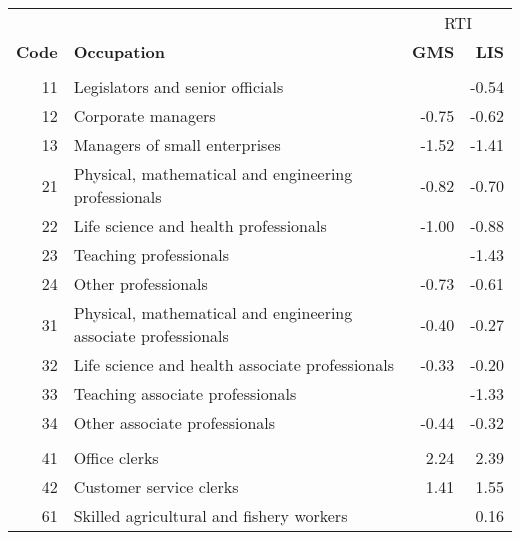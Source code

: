 
\begin{tabular}{rlrr}
\toprule
\multicolumn{1}{c}{} & \multicolumn{1}{c}{} & \multicolumn{2}{c}{RTI} \\
\cmidrule(l{3pt}r{3pt}){3-4}
\textbf{Code} & \textbf{Occupation} & \textbf{GMS} & \textbf{LIS}\\
\midrule
\addlinespace[0.3em]
\multicolumn{4}{l}{\textbf{High-paying occupations}}\\
\hspace{1em}11 & Legislators and senior officials &  & -0.54\\
\hspace{1em}12 & Corporate managers & -0.75 & -0.62\\
\hspace{1em}13 & Managers of small enterprises & -1.52 & -1.41\\
\hspace{1em}21 & Physical, mathematical and engineering professionals & -0.82 & -0.70\\
\hspace{1em}22 & Life science and health professionals & -1.00 & -0.88\\
\hspace{1em}23 & Teaching professionals &  & -1.43\\
\hspace{1em}24 & Other professionals & -0.73 & -0.61\\
\hspace{1em}31 & Physical, mathematical and engineering associate professionals & -0.40 & -0.27\\
\hspace{1em}32 & Life science and health associate professionals & -0.33 & -0.20\\
\hspace{1em}33 & Teaching associate professionals &  & -1.33\\
\hspace{1em}34 & Other associate professionals & -0.44 & -0.32\\
\addlinespace[0.3em]
\multicolumn{4}{l}{\textbf{Middling occupations}}\\
\hspace{1em}41 & Office clerks & 2.24 & 2.39\\
\hspace{1em}42 & Customer service clerks & 1.41 & 1.55\\
\hspace{1em}61 & Skilled agricultural and fishery workers &  & 0.16\\

\end{tabular}
